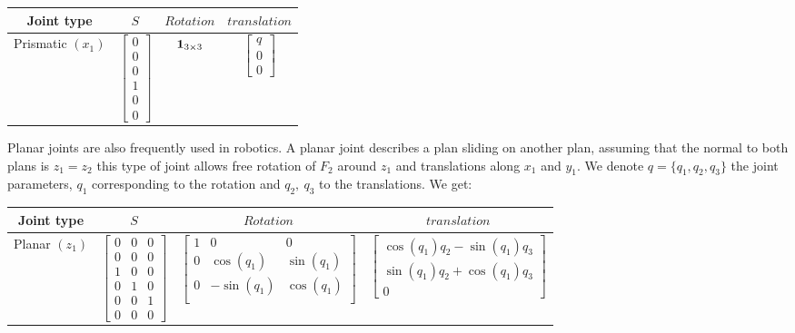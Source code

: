 \begin{table} [ht]
\centering
\begin{tabular}{cccc}
  \toprule
  Joint type & $S$ & $Rotation$ & $translation$ \\
  \midrule
  Prismatic $(x_1)$
  &
  $\begin{bmatrix}
    0 \\ 0 \\ 0 \\ 1 \\ 0 \\ 0
  \end{bmatrix}$
  &
  ${\bf 1}_{3\times3} $
  &
  $\begin{bmatrix}
    q \\ 0 \\ 0
  \end{bmatrix}$
  \\
  \bottomrule
\end{tabular}
\end{table}

Planar joints are also frequently used in robotics.
A planar joint describes a plan sliding on another plan, assuming that the normal to both plans is $z_1 = z_2$ this type of joint allows free rotation of $F_2$ around $z_1$ and translations along $x_1$ and $y_1$.
We denote $q = \{q_1, q_2, q_3\}$ the joint parameters, $q_1$ corresponding to the rotation and $q_2,\ q_3$ to the translations.
We get:

\begin{table} [ht]
\centering
\begin{tabular}{cccc}
  \toprule
  Joint type & $S$ & $Rotation$ & $translation$ \\
  \midrule
  Planar $(z_1)$
  &
  $\begin{bmatrix}
    0 & 0 & 0 \\ 0 & 0 & 0 \\ 1 & 0 & 0 \\ 0 & 1 & 0 \\ 0 & 0 & 1 \\ 0 & 0 & 0
  \end{bmatrix}$
  &
  $\begin{bmatrix}
    1 & 0 & 0 \\
    0 & \cos(q_1) & \sin(q_1) \\
    0 & -\sin(q_1) & \cos(q_1) \\
  \end{bmatrix}$
  &
  $\begin{bmatrix}
    \cos(q_1)q_2 - \sin(q_1)q_3 \\ \sin(q_1)q_2 + \cos(q_1)q_3 \\ 0
  \end{bmatrix}$
  \\
  \bottomrule
\end{tabular}
\end{table}

